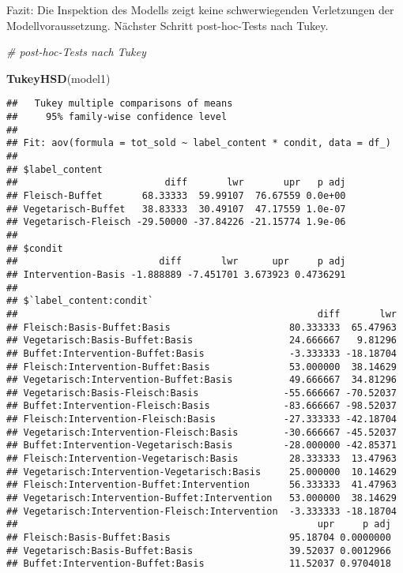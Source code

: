 \documentclass[]{article}
\newenvironment{Shaded}{\begin{snugshade}}{\end{snugshade}}
\newcommand{\KeywordTok}[1]{\textcolor[rgb]{0.13,0.29,0.53}{\textbf{#1}}}
\newcommand{\CommentTok}[1]{\textcolor[rgb]{0.56,0.35,0.01}{\textit{#1}}}
\newcommand{\NormalTok}[1]{#1}
\begin{document}
Fazit: Die Inspektion des Modells zeigt keine schwerwiegenden
Verletzungen der Modellvoraussetzung. Nächster Schritt post-hoc-Tests
nach Tukey.

\begin{Shaded}
\begin{Highlighting}[]
\CommentTok{# post-hoc-Tests nach Tukey}

\KeywordTok{TukeyHSD}\NormalTok{(model1)}
\end{Highlighting}
\end{Shaded}

\begin{verbatim}
##   Tukey multiple comparisons of means
##     95% family-wise confidence level
## 
## Fit: aov(formula = tot_sold ~ label_content * condit, data = df_)
## 
## $label_content
##                          diff       lwr       upr   p adj
## Fleisch-Buffet       68.33333  59.99107  76.67559 0.0e+00
## Vegetarisch-Buffet   38.83333  30.49107  47.17559 1.0e-07
## Vegetarisch-Fleisch -29.50000 -37.84226 -21.15774 1.9e-06
## 
## $condit
##                         diff       lwr      upr     p adj
## Intervention-Basis -1.888889 -7.451701 3.673923 0.4736291
## 
## $`label_content:condit`
##                                                     diff       lwr
## Fleisch:Basis-Buffet:Basis                     80.333333  65.47963
## Vegetarisch:Basis-Buffet:Basis                 24.666667   9.81296
## Buffet:Intervention-Buffet:Basis               -3.333333 -18.18704
## Fleisch:Intervention-Buffet:Basis              53.000000  38.14629
## Vegetarisch:Intervention-Buffet:Basis          49.666667  34.81296
## Vegetarisch:Basis-Fleisch:Basis               -55.666667 -70.52037
## Buffet:Intervention-Fleisch:Basis             -83.666667 -98.52037
## Fleisch:Intervention-Fleisch:Basis            -27.333333 -42.18704
## Vegetarisch:Intervention-Fleisch:Basis        -30.666667 -45.52037
## Buffet:Intervention-Vegetarisch:Basis         -28.000000 -42.85371
## Fleisch:Intervention-Vegetarisch:Basis         28.333333  13.47963
## Vegetarisch:Intervention-Vegetarisch:Basis     25.000000  10.14629
## Fleisch:Intervention-Buffet:Intervention       56.333333  41.47963
## Vegetarisch:Intervention-Buffet:Intervention   53.000000  38.14629
## Vegetarisch:Intervention-Fleisch:Intervention  -3.333333 -18.18704
##                                                     upr     p adj
## Fleisch:Basis-Buffet:Basis                     95.18704 0.0000000
## Vegetarisch:Basis-Buffet:Basis                 39.52037 0.0012966
## Buffet:Intervention-Buffet:Basis               11.52037 0.9704018

\end{verbatim}
\end{document}
